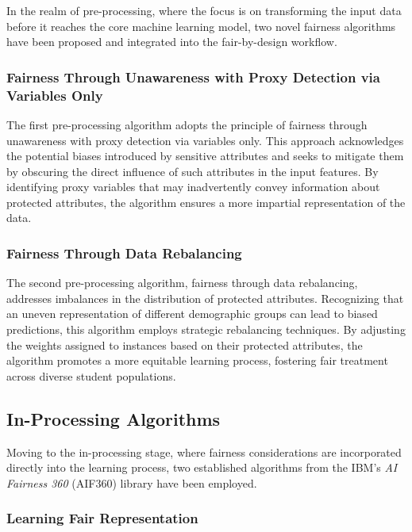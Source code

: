 \documentclass[12pt,a4paper,openright,twoside]{book}
\begin{document}
In the realm of pre-processing, where the focus is on transforming the input data before it reaches the core machine learning model, two novel fairness algorithms have been proposed and integrated into the fair-by-design workflow.

\subsubsection{Fairness Through Unawareness with Proxy Detection via Variables Only}

The first pre-processing algorithm adopts the principle of fairness through unawareness with proxy detection via variables only. This approach acknowledges the potential biases introduced by sensitive attributes and seeks to mitigate them by obscuring the direct influence of such attributes in the input features. By identifying proxy variables that may inadvertently convey information about protected attributes, the algorithm ensures a more impartial representation of the data.

\subsubsection{Fairness Through Data Rebalancing}

The second pre-processing algorithm, fairness through data rebalancing, addresses imbalances in the distribution of protected attributes. Recognizing that an uneven representation of different demographic groups can lead to biased predictions, this algorithm employs strategic rebalancing techniques. By adjusting the weights assigned to instances based on their protected attributes, the algorithm promotes a more equitable learning process, fostering fair treatment across diverse student populations.

\subsection{In-Processing Algorithms}

Moving to the in-processing stage, where fairness considerations are incorporated directly into the learning process, two established algorithms from the IBM's \emph{AI Fairness 360} (AIF360) library have been employed.

\subsubsection{Learning Fair Representation}
\end{document}
